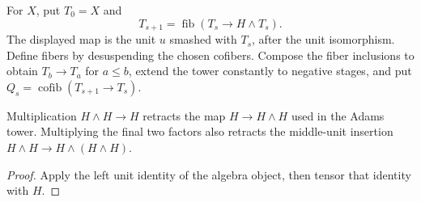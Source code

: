 \begin{definition}
  \label{def:h6-fiber-tower}
  \notready
  For $X$, put $T_0=X$ and
  \[
    T_{s+1}=\operatorname{fib}(T_s\longrightarrow H\wedge T_s).
  \]
  The displayed map is the unit $u$ smashed with $T_s$, after the unit
  isomorphism.  Define fibers by desuspending the chosen cofibers.
  Compose the fiber inclusions to obtain $T_b\to T_a$ for $a\le b$,
  extend the tower constantly to negative stages, and put
  $Q_s=\operatorname{cofib}(T_{s+1}\to T_s)$.
\end{definition}

\begin{proposition}
  \label{prop:h6-unit-splits}
  \leanok
  Multiplication $H\wedge H\to H$ retracts the map
  $H\to H\wedge H$ used in the Adams tower. Multiplying the final two
  factors also retracts the middle-unit insertion
  $H\wedge H\to H\wedge(H\wedge H)$.
\end{proposition}
\begin{proof}
  Apply the left unit identity of the algebra object, then tensor that
  identity with $H$.
  \leanok
\end{proof}

